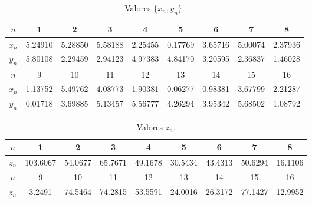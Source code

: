 \begin{table}[h!]
\centering
\begin{tabular}{|c|c|c|c|c|c|c|c|c|} 
 \hline
$n$   & 1 & 2 & 3 & 4 & 5 & 6 & 7 & 8\\ \hline
$x_n$ & 5.24910 & 5.28850 & 5.58188 & 2.25455 & 0.17769 & 3.65716 & 5.00074 & 2.37936 \\ \hline
$y_n$ & 5.80108 & 2.29459 & 2.94123 & 4.97383 & 4.84170 & 3.20595 & 2.36837 & 1.46028 \\ \hline
 \hline
$n$   & 9 & 10 & 11 & 12 & 13 & 14 & 15 & 16\\  \hline
$x_n$ & 1.13752 & 5.49762 & 4.08773 & 1.90381 & 0.06277 & 0.98381 & 3.67799 & 2.21287 \\ \hline
$y_n$ & 0.01718 & 3.69885 & 5.13457 & 5.56777 & 4.26294 & 3.95342 & 5.68502 & 1.08792 \\ \hline
\end{tabular}
\caption{Valores $\{x_n,y_n\}$.}
\label{table:theo:maphxr2r1:xnyn}
\end{table}



\begin{table}[h!]
\centering
\begin{tabular}{|c|c|c|c|c|c|c|c|c|} 
 \hline
$n$   & 1 & 2 & 3 & 4 & 5 & 6 & 7 & 8\\ \hline
$z_n$ & 103.6067 & 54.0677 & 65.7671 & 49.1678 & 30.5434 & 43.4313 & 50.6294 & 16.1106  \\ \hline
 \hline
$n$   & 9 & 10 & 11 & 12 & 13 & 14 & 15 & 16\\  \hline
$z_n$ & 3.2491 & 74.5464 & 74.2815 & 53.5591 & 24.0016 & 26.3172 & 77.1427 & 12.9952 \\ \hline
\end{tabular}
\caption{Valores $z_n$.}
\label{table:theo:maphxr2r1:zn}
\end{table}

     

